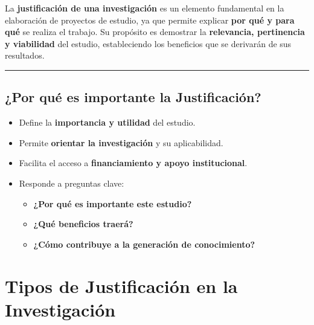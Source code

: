 \documentclass[
  letterpaper,
  DIV=11,
  numbers=noendperiod]{scrartcl}
\providecommand{\tightlist}{%
  \setlength{\itemsep}{0pt}\setlength{\parskip}{0pt}}
\begin{document}
La \textbf{justificación de una investigación} es un elemento
fundamental en la elaboración de proyectos de estudio, ya que permite
explicar \textbf{por qué y para qué} se realiza el trabajo. Su propósito
es demostrar la \textbf{relevancia, pertinencia y viabilidad} del
estudio, estableciendo los beneficios que se derivarán de sus
resultados.

\begin{center}\rule{0.5\linewidth}{0.5pt}\end{center}

\subsection{\texorpdfstring{\textbf{¿Por qué es importante la
Justificación?}}{¿Por qué es importante la Justificación?}}\label{por-quuxe9-es-importante-la-justificaciuxf3n}

\begin{itemize}
\tightlist
\item
  Define la \textbf{importancia y utilidad} del estudio.\\
\item
  Permite \textbf{orientar la investigación} y su aplicabilidad.\\
\item
  Facilita el acceso a \textbf{financiamiento y apoyo institucional}.\\
\item
  Responde a preguntas clave:

  \begin{itemize}
  \tightlist
  \item
    \textbf{¿Por qué es importante este estudio?}\\
  \item
    \textbf{¿Qué beneficios traerá?}\\
  \item
    \textbf{¿Cómo contribuye a la generación de conocimiento?}
  \end{itemize}
\end{itemize}

\section{\texorpdfstring{\textbf{Tipos de Justificación en la
Investigación}}{Tipos de Justificación en la Investigación}}\label{tipos-de-justificaciuxf3n-en-la-investigaciuxf3n}
\end{document}
